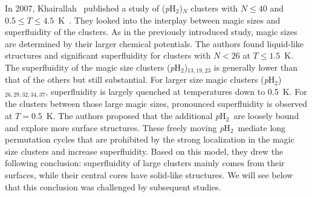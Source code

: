\documentclass[12pt]{iopart}
\newcommand{\phtwo}{{\em p}H$_2$}
\begin{document}
In 2007, Khairallah \etal~published a study of (\phtwo)$_N$ clusters with $N\le 40$ and $0.5 \le T \le 4.5$~K~\cite{magicnumber_pH2}. 
They looked into the interplay between magic sizes and superfluidity of the clusters. 
As in the previously introduced study, magic sizes are determined by their larger chemical potentials. 
The authors found liquid-like structures and significant superfluidity for clusters with $N < 26$ at $T\le 1.5$~K. 
The superfluidity of the magic size clusters (\phtwo)$_{13,19,23}$ is generally lower than that of the others 
but still substantial. 
For larger size magic clusters (\phtwo)$_{26,29,32,34,37}$, superfluidity is largely quenched at temperatures down to 0.5~K. 
For the clusters between those large magic sizes, pronounced superfluidity is observed at $T=0.5$~K. 
The authors proposed that the additional \phtwo~are loosely bound and  explore more surface structures. 
These freely moving \phtwo~mediate long permutation cycles that are prohibited by the strong localization in the magic size clusters and increase  superfluidity. Based on this model, they drew the following conclusion: superfluidity of large  clusters mainly comes from their surfaces, while their central cores have solid-like structures.  We will see below that this conclusion was challenged by subsequent studies.
\end{document}
